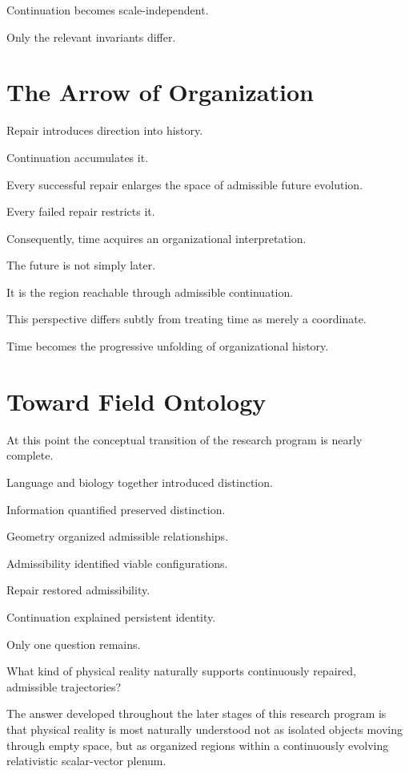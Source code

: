 \documentclass[11pt,oneside]{book}
\numberwithin{equation}{chapter}
\theoremstyle{definition}
\theoremstyle{plain}
\begin{document}
Continuation becomes scale-independent.

Only the relevant invariants differ.

\section{The Arrow of Organization}

Repair introduces direction into history.

Continuation accumulates it.

Every successful repair enlarges the space of admissible future evolution.

Every failed repair restricts it.

Consequently, time acquires an organizational interpretation.

The future is not simply later.

It is the region reachable through admissible continuation.

This perspective differs subtly from treating time as merely a coordinate.

Time becomes the progressive unfolding of organizational history.

\section{Toward Field Ontology}

At this point the conceptual transition of the research program is nearly
complete.

Language and biology together introduced distinction.

Information quantified preserved distinction.

Geometry organized admissible relationships.

Admissibility identified viable configurations.

Repair restored admissibility.

Continuation explained persistent identity.

Only one question remains.

What kind of physical reality naturally supports continuously repaired,
admissible trajectories?

The answer developed throughout the later stages of this research program is
that physical reality is most naturally understood not as isolated objects
moving through empty space, but as organized regions within a continuously
evolving relativistic scalar-vector plenum.
\end{document}
